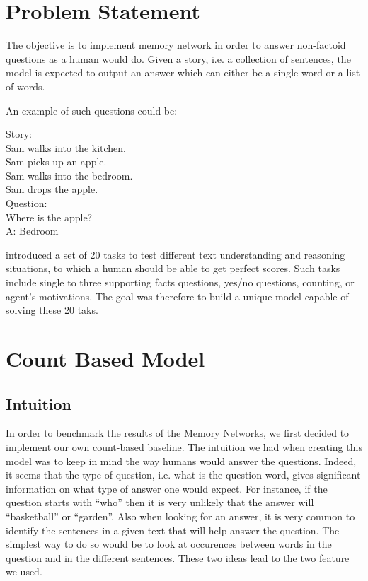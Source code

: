 \documentclass[twoside,11pt]{article}
\begin{document}
\section{Problem Statement}

The objective is to implement memory network in order to answer non-factoid questions as a human would do. Given a story, i.e. a collection of sentences, the model is expected to output an answer which can either be a single word or a list of words.

\noindent An example of such questions could be:

\begin{framed}
\begin{center}
Story: \\
Sam walks into the kitchen.\\
Sam picks up an apple.\\
Sam walks into the bedroom.\\
Sam drops the apple.\\
Question:\\
Where is the apple?\\
A: Bedroom
\end{center}
\end{framed}

\noindent \cite{aiqua} introduced a set of 20 tasks to test different text understanding and reasoning situations, to which a human should be able to get perfect scores. Such tasks include  single to three supporting facts questions, yes/no questions, counting, or agent's motivations. The goal was therefore to build a unique model capable of solving these 20 taks.

\section{Count Based Model}

\subsection{Intuition}

In order to benchmark the results of the Memory Networks, we first decided to implement our own count-based baseline. The intuition we had when creating this model was to keep in mind the way humans would answer the questions. Indeed, it seems that the type of question, i.e. what is the question word, gives significant information on what type of answer one would expect. For instance, if the question starts with ``who'' then it is very unlikely that the answer will ``basketball'' or ``garden''. Also when looking for an answer, it is very common to identify the sentences in a given text that will help answer the question. The simplest way to do so would be to look at occurences between words in the question and in the different sentences. These two ideas lead to the two feature we used.
\end{document}

